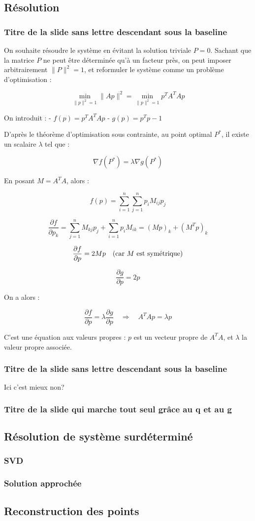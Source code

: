 \subsection{Résolution}
\begin{frame}
\frametitle{Titre de la slide sans lettre descendant sous la baseline}

On souhaite résoudre le système en évitant la solution triviale \( P = 0 \).  
Sachant que la matrice \( P \) ne peut être déterminée qu'à un facteur près, on peut imposer arbitrairement \( \|P\|^2 = 1 \), et reformuler le système comme un problème d'optimisation :

\[
\min_{\|p\|^2 = 1} \|Ap\|^2 = \min_{\|p\|^2 = 1} p^T A^T A p
\]

On introduit :
- \( f(p) = p^T A^T A p \)
- \( g(p) = p^T p - 1 \)

D’après le théorème d’optimisation sous contrainte, au point optimal \( P^* \), il existe un scalaire \( \lambda \) tel que :

\[
\nabla f(P^*) = \lambda \nabla g(P^*)
\]

En posant \( M = A^T A \), alors :

\[
f(p) = \sum_{i=1}^n \sum_{j=1}^n p_i M_{ij} p_j
\]

\[
\frac{\partial f}{\partial p_k} = \sum_{j=1}^n M_{kj} p_j + \sum_{i=1}^n p_i M_{ik} = (Mp)_k + (M^T p)_k
\]

\[
\frac{\partial f}{\partial p} = 2Mp \quad \text{(car \( M \) est symétrique)}
\]

\[
\frac{\partial g}{\partial p} = 2p
\]

On a alors :

\[
\frac{\partial f}{\partial p} = \lambda \frac{\partial g}{\partial p} \quad \Rightarrow \quad \boxed{A^T A p = \lambda p}
\]

C’est une équation aux valeurs propres : \( p \) est un vecteur propre de \( A^T A \), et \( \lambda \) la valeur propre associée.
\end{frame}

\begin{frame}
\frametitle{Titre de la slide sans lettre descendant sous la baseline}
    Ici c'est mieux non?
\end{frame}

\begin{frame}[fragile]
\frametitle{Titre de la slide qui marche tout seul grâce au q et au g}
\end{frame}

\subsection{Résolution de système surdéterminé}
\subsubsection{SVD}
\subsubsection{Solution approchée}
\subsection{Reconstruction des points}
